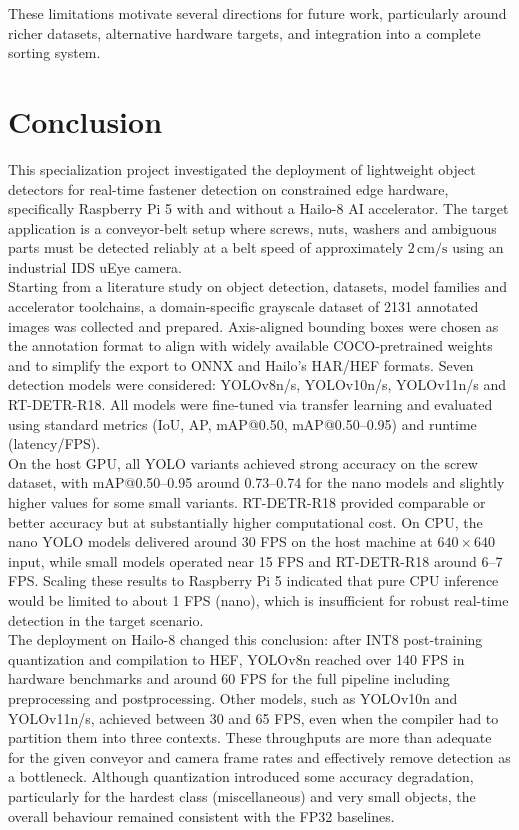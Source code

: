 \documentclass[12pt,a4paper]{report}
\begin{document}
These limitations motivate several directions for future work, particularly around richer datasets,
alternative hardware targets, and integration into a complete sorting system.


\chapter{Conclusion}

This specialization project investigated the deployment of lightweight object detectors
for real-time fastener detection on constrained edge hardware, specifically Raspberry Pi 5 with
and without a Hailo-8 AI accelerator.
The target application is a conveyor-belt setup where screws, nuts, washers and ambiguous
parts must be detected reliably at a belt speed of approximately \(2\,\text{cm/s}\) using an
industrial IDS uEye camera. \\

Starting from a literature study on object detection, datasets, model families and accelerator
toolchains, a domain-specific grayscale dataset of 2131 annotated images was collected and prepared.
Axis-aligned bounding boxes were chosen as the annotation format to align with widely available
COCO-pretrained weights and to simplify the export to ONNX and Hailo’s HAR/HEF formats.
Seven detection models were considered: YOLOv8n/s, YOLOv10n/s, YOLOv11n/s and RT-DETR-R18.
All models were fine-tuned via transfer learning and evaluated using standard metrics
(IoU, AP, mAP@0.50, mAP@0.50–0.95) and runtime (latency/FPS). \\

On the host GPU, all YOLO variants achieved strong accuracy on the screw dataset,
with mAP@0.50–0.95 around 0.73–0.74 for the nano models and slightly higher values
for some small variants.
RT-DETR-R18 provided comparable or better accuracy but at substantially higher computational cost.
On CPU, the nano YOLO models delivered around 30 FPS on the host machine
at \(640\times640\) input, while small models operated near 15 FPS and RT-DETR-R18 around 6–7 FPS.
Scaling these results to Raspberry Pi 5 indicated that pure CPU inference would
be limited to about 1 FPS (nano), which is insufficient for robust real-time detection
in the target scenario. \\

The deployment on Hailo-8 changed this conclusion: after INT8 post-training quantization
and compilation to HEF, YOLOv8n reached over 140 FPS in hardware benchmarks and
around 60 FPS for the full pipeline including preprocessing and postprocessing.
Other models, such as YOLOv10n and YOLOv11n/s, achieved between 30 and 65 FPS, even
when the compiler had to partition them into three contexts.
These throughputs are more than adequate for the given conveyor and camera frame rates
and effectively remove detection as a bottleneck.
Although quantization introduced some accuracy degradation, particularly for the hardest
class (miscellaneous) and very small objects, the overall behaviour remained consistent
with the FP32 baselines. \\
\end{document}
